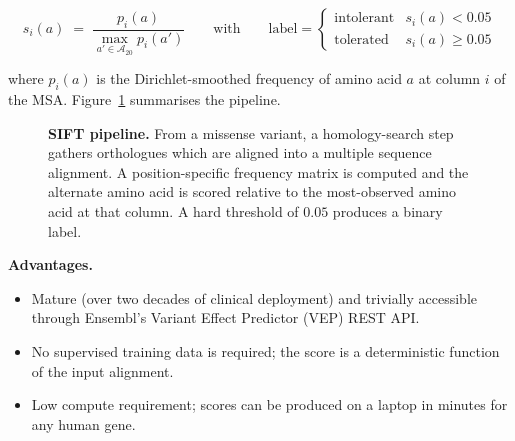 \documentclass[11pt,a4paper,oneside]{report}
\begin{document}
\[
s_i(a) \;=\; \frac{p_i(a)}{\max_{a' \in \mathcal{A}_{20}} p_i(a')}
\qquad\text{with}\qquad
\text{label} = \begin{cases}
\text{intolerant}  & s_i(a) < 0.05 \\
\text{tolerated} & s_i(a) \geq 0.05
\end{cases}
\]

where $p_i(a)$ is the Dirichlet-smoothed frequency of
amino acid $a$ at column $i$ of the MSA.
Figure~\ref{fig:sift-pipeline} summarises the pipeline.

\begin{figure}[htbp]
\centering
{}
\caption[SIFT pipeline]{\textbf{SIFT pipeline.} From a missense
variant, a homology-search step gathers orthologues which are
aligned into a multiple sequence alignment. A position-specific
frequency matrix is computed and the alternate amino acid is
scored relative to the most-observed amino acid at that
column. A hard threshold of $0.05$ produces a binary label.}
\label{fig:sift-pipeline}
\end{figure}

\textbf{Advantages.}
\begin{itemize}[leftmargin=2em, itemsep=0.15em]
  \item Mature (over two decades of clinical deployment) and
    trivially accessible through Ensembl's Variant Effect
    Predictor (VEP) REST API.
  \item No supervised training data is required; the score
    is a deterministic function of the input alignment.
  \item Low compute requirement; scores can be produced
    on a laptop in minutes for any human gene.
\end{itemize}
\end{document}

